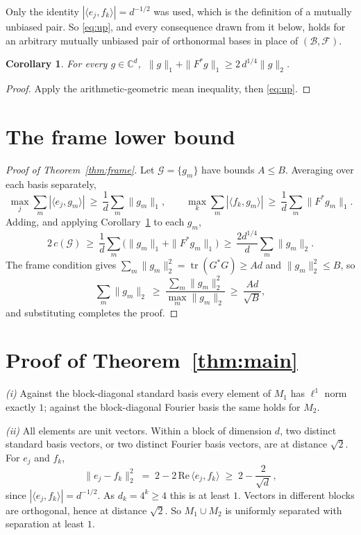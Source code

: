 \documentclass[11pt,reqno]{amsart}
\theoremstyle{plain}
\newtheorem{corollary}[theorem]{Corollary}
\theoremstyle{definition}
\theoremstyle{remark}
\DeclareMathOperator{\tr}{tr}
\newcommand{\C}{\mathbb{C}}
\begin{document}
Only the identity $|\langle e_j,f_k\rangle|=d^{-1/2}$ was used, which is
the definition of a mutually unbiased pair.  So \eqref{eq:up}, and every
consequence drawn from it below, holds for an arbitrary mutually
unbiased pair of orthonormal bases in place of
$(\mathcal{B},\mathcal{F})$.

\begin{corollary}\label{cor:amgm}
For every $g\in\C^d$, $\ \|g\|_1+\|F^{*}g\|_1\ge2\,d^{1/4}\|g\|_2$.
\end{corollary}

\begin{proof}
Apply the arithmetic-geometric mean inequality, then \eqref{eq:up}.
\end{proof}

\section{The frame lower bound}

\begin{proof}[Proof of Theorem~\textup{\ref{thm:frame}}]
Let $\mathcal{G}=\{g_m\}$ have bounds $A\le B$.  Averaging over each
basis separately,
\[
  \max_j\sum_m|\langle e_j,g_m\rangle|\ \ge\ \frac1d\sum_m\|g_m\|_1,
  \qquad
  \max_k\sum_m|\langle f_k,g_m\rangle|\ \ge\ \frac1d\sum_m\|F^{*}g_m\|_1 .
\]
Adding, and applying Corollary~\ref{cor:amgm} to each $g_m$,
\[
  2\,c(\mathcal{G})\ \ge\ \frac1d\sum_m
  \bigl(\|g_m\|_1+\|F^{*}g_m\|_1\bigr)
  \ \ge\ \frac{2d^{1/4}}{d}\sum_m\|g_m\|_2 .
\]
The frame condition gives $\sum_m\|g_m\|_2^2=\tr(G^{*}G)\ge Ad$ and
$\|g_m\|_2^2\le B$, so
\[
  \sum_m\|g_m\|_2\ \ge\ \frac{\sum_m\|g_m\|_2^2}{\max_m\|g_m\|_2}
  \ \ge\ \frac{Ad}{\sqrt B},
\]
and substituting completes the proof.
\end{proof}

\section{Proof of Theorem~\ref{thm:main}}\label{sec:main}

\emph{(i)}  Against the block-diagonal standard basis every element of
$M_1$ has $\ell^1$ norm exactly $1$; against the block-diagonal Fourier
basis the same holds for $M_2$.

\emph{(ii)}  All elements are unit vectors.  Within a block of dimension
$d$, two distinct standard basis vectors, or two distinct Fourier basis
vectors, are at distance $\sqrt2$.  For $e_j$ and $f_k$,
\[
  \|e_j-f_k\|_2^2\;=\;2-2\,\mathrm{Re}\,\langle e_j,f_k\rangle
  \;\ge\;2-\frac{2}{\sqrt d}\,,
\]
since $|\langle e_j,f_k\rangle|=d^{-1/2}$.  As $d_k=4^k\ge4$ this is at
least $1$.  Vectors in different blocks are orthogonal, hence at
distance $\sqrt2$.  So $M_1\cup M_2$ is uniformly separated with
separation at least $1$.
\end{document}
